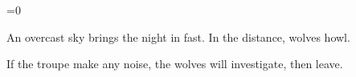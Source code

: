 \ifnum\value{cycle}=0

\begin{boxtext}
  An overcast sky brings the night in fast.
  In the distance, wolves howl.
\end{boxtext}

If the troupe make any noise, the wolves will investigate, then leave.

\wolf

\fi

